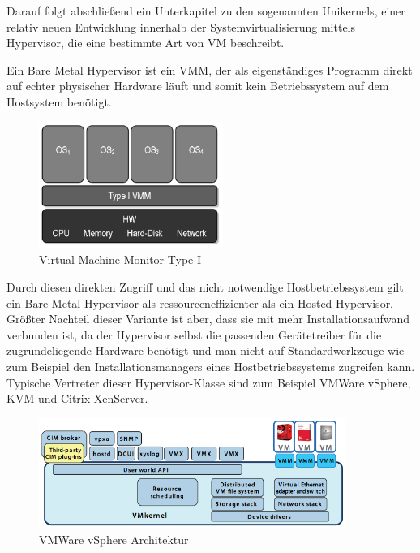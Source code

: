Darauf folgt abschließend ein Unterkapitel zu den sogenannten Unikernels, einer relativ neuen Entwicklung innerhalb der Systemvirtualisierung mittels Hypervisor, die eine bestimmte Art von \ac{VM} beschreibt.


Ein Bare Metal Hypervisor ist ein \ac{VMM}, der als eigenständiges Programm direkt auf echter physischer Hardware läuft und somit kein Betriebssystem auf dem Hostsystem benötigt.

\begin{figure}[!ht]
  \begin{center}
    \includegraphics[width=6cm]{bilder/VMM-Type1.jpg}
    \caption{Virtual Machine Monitor Type I \citep{wiki:002}}
  \end{center}
\end{figure}

Durch diesen direkten Zugriff und das nicht notwendige Hostbetriebssystem gilt ein Bare Metal Hypervisor als ressourceneffizienter als ein Hosted Hypervisor. Größter Nachteil dieser Variante ist aber, dass sie mit mehr Installationsaufwand verbunden ist, da der Hypervisor selbst die passenden Gerätetreiber für die zugrundeliegende Hardware benötigt und man nicht auf Standardwerkzeuge wie zum Beispiel den Installationsmanagers eines Hostbetriebssystems zugreifen kann. Typische Vertreter dieser Hypervisor-Klasse sind zum Beispiel VMWare vSphere, KVM und Citrix XenServer.

\begin{figure}[!ht]
  \begin{center}
    \includegraphics[width=10cm]{bilder/vmware.png}
    \caption{VMWare vSphere Architektur \citep{vmware:002}}
  \end{center}
\end{figure}

